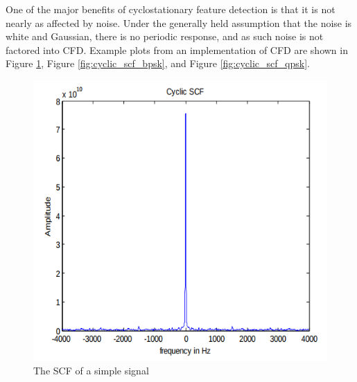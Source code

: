 One of the major benefits of cyclostationary feature detection is that it is not nearly as affected by noise. Under the generally held assumption that the noise is white and Gaussian, there is no periodic response, and as such noise is not factored into CFD. Example plots from an implementation of CFD are shown in Figure \ref{fig:cyclic_scf}, Figure \ref{fig:cyclic_scf_bpsk}, and Figure \ref{fig:cyclic_scf_qpsk}. \par
\begin{figure}[ht!]
\centering
  \includegraphics[scale=0.4]{img/cyclic_scf.png}
\caption{The SCF of a simple signal}
\label{fig:cyclic_scf}

\end{figure}
